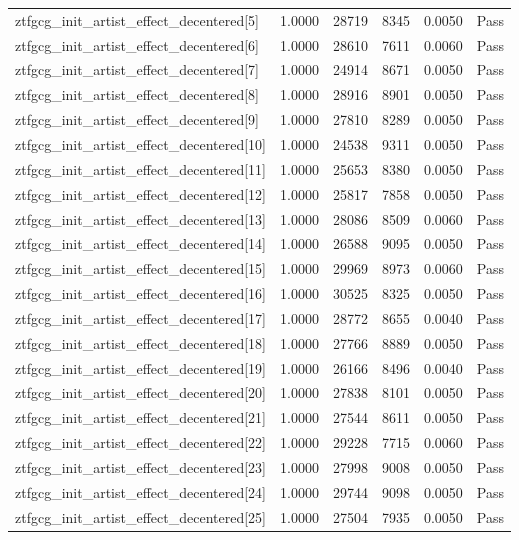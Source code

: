 \begin{table}[htbp]
\begin{tabular}{llrrll}
ztfgcg\_init\_artist\_effect\_decentered[5] & 1.0000 & 28719 & 8345 & 0.0050 & Pass \\
ztfgcg\_init\_artist\_effect\_decentered[6] & 1.0000 & 28610 & 7611 & 0.0060 & Pass \\
ztfgcg\_init\_artist\_effect\_decentered[7] & 1.0000 & 24914 & 8671 & 0.0050 & Pass \\
ztfgcg\_init\_artist\_effect\_decentered[8] & 1.0000 & 28916 & 8901 & 0.0050 & Pass \\
ztfgcg\_init\_artist\_effect\_decentered[9] & 1.0000 & 27810 & 8289 & 0.0050 & Pass \\
ztfgcg\_init\_artist\_effect\_decentered[10] & 1.0000 & 24538 & 9311 & 0.0050 & Pass \\
ztfgcg\_init\_artist\_effect\_decentered[11] & 1.0000 & 25653 & 8380 & 0.0050 & Pass \\
ztfgcg\_init\_artist\_effect\_decentered[12] & 1.0000 & 25817 & 7858 & 0.0050 & Pass \\
ztfgcg\_init\_artist\_effect\_decentered[13] & 1.0000 & 28086 & 8509 & 0.0060 & Pass \\
ztfgcg\_init\_artist\_effect\_decentered[14] & 1.0000 & 26588 & 9095 & 0.0050 & Pass \\
ztfgcg\_init\_artist\_effect\_decentered[15] & 1.0000 & 29969 & 8973 & 0.0060 & Pass \\
ztfgcg\_init\_artist\_effect\_decentered[16] & 1.0000 & 30525 & 8325 & 0.0050 & Pass \\
ztfgcg\_init\_artist\_effect\_decentered[17] & 1.0000 & 28772 & 8655 & 0.0040 & Pass \\
ztfgcg\_init\_artist\_effect\_decentered[18] & 1.0000 & 27766 & 8889 & 0.0050 & Pass \\
ztfgcg\_init\_artist\_effect\_decentered[19] & 1.0000 & 26166 & 8496 & 0.0040 & Pass \\
ztfgcg\_init\_artist\_effect\_decentered[20] & 1.0000 & 27838 & 8101 & 0.0050 & Pass \\
ztfgcg\_init\_artist\_effect\_decentered[21] & 1.0000 & 27544 & 8611 & 0.0050 & Pass \\
ztfgcg\_init\_artist\_effect\_decentered[22] & 1.0000 & 29228 & 7715 & 0.0060 & Pass \\
ztfgcg\_init\_artist\_effect\_decentered[23] & 1.0000 & 27998 & 9008 & 0.0050 & Pass \\
ztfgcg\_init\_artist\_effect\_decentered[24] & 1.0000 & 29744 & 9098 & 0.0050 & Pass \\
ztfgcg\_init\_artist\_effect\_decentered[25] & 1.0000 & 27504 & 7935 & 0.0050 & Pass \\

\end{tabular}
\end{table}
